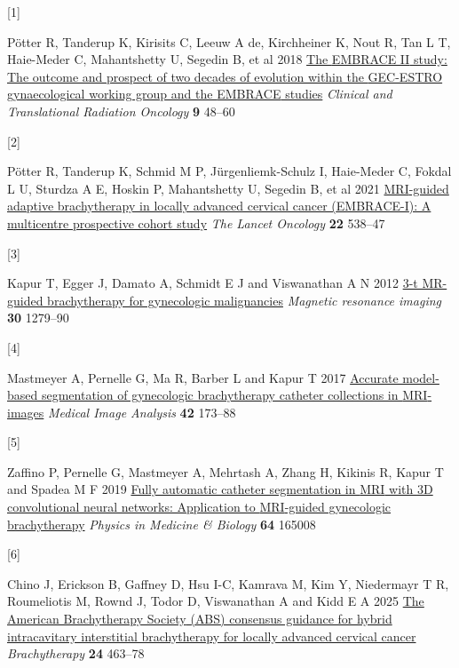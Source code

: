 \documentclass[
  11pt,
]{article}
\newlength{\cslhangindent}
\newlength{\csllabelwidth}
\newenvironment{CSLReferences}[2] %
 {\begin{list}{}{%
  \setlength{\itemindent}{0pt}
  \setlength{\leftmargin}{0pt}
  \setlength{\parsep}{0pt}
  \ifodd #1
   \setlength{\leftmargin}{\cslhangindent}
   \setlength{\itemindent}{-1\cslhangindent}
  \fi
  \setlength{\itemsep}{#2\baselineskip}}}
 {\end{list}}
\newcommand{\CSLLeftMargin}[1]{\parbox[t]{\csllabelwidth}{\strut#1\strut}}
\newcommand{\CSLRightInline}[1]{\parbox[t]{\linewidth - \csllabelwidth}{\strut#1\strut}}
\begin{document}
\label{refs}
\begin{CSLReferences}{0}{1}
\CSLLeftMargin{{[}1{]} }%
\CSLRightInline{Pötter R, Tanderup K, Kirisits C, Leeuw A de,
Kirchheiner K, Nout R, Tan L T, Haie-Meder C, Mahantshetty U, Segedin B,
et al 2018 \href{https://doi.org/10.1016/j.ctro.2018.01.001}{The
{EMBRACE II} study: The outcome and prospect of two decades of evolution
within the {GEC-ESTRO} gynaecological working group and the {EMBRACE}
studies} \emph{Clinical and Translational Radiation Oncology} \textbf{9}
48--60}

\CSLLeftMargin{{[}2{]} }%
\CSLRightInline{Pötter R, Tanderup K, Schmid M P, Jürgenliemk-Schulz I,
Haie-Meder C, Fokdal L U, Sturdza A E, Hoskin P, Mahantshetty U, Segedin
B, et al 2021
\href{https://doi.org/10.1016/S1470-2045(20)30753-1}{{MRI}-guided
adaptive brachytherapy in locally advanced cervical cancer
({EMBRACE-I}): A multicentre prospective cohort study} \emph{The Lancet
Oncology} \textbf{22} 538--47}

\CSLLeftMargin{{[}3{]} }%
\CSLRightInline{Kapur T, Egger J, Damato A, Schmidt E J and Viswanathan
A N 2012 \href{https://doi.org/10.1016/j.mri.2012.06.003}{3-t MR-guided
brachytherapy for gynecologic malignancies} \emph{Magnetic resonance
imaging} \textbf{30} 1279--90}

\CSLLeftMargin{{[}4{]} }%
\CSLRightInline{Mastmeyer A, Pernelle G, Ma R, Barber L and Kapur T 2017
\href{https://doi.org/10.1016/j.media.2017.06.011}{Accurate model-based
segmentation of gynecologic brachytherapy catheter collections in
{MRI}-images} \emph{Medical Image Analysis} \textbf{42} 173--88}

\CSLLeftMargin{{[}5{]} }%
\CSLRightInline{Zaffino P, Pernelle G, Mastmeyer A, Mehrtash A, Zhang H,
Kikinis R, Kapur T and Spadea M F 2019
\href{https://doi.org/10.1088/1361-6560/ab2f47}{Fully automatic catheter
segmentation in {MRI} with {3D} convolutional neural networks:
Application to {MRI}-guided gynecologic brachytherapy} \emph{Physics in
Medicine \& Biology} \textbf{64} 165008}

\CSLLeftMargin{{[}6{]} }%
\CSLRightInline{Chino J, Erickson B, Gaffney D, Hsu I-C, Kamrava M, Kim
Y, Niedermayr T R, Roumeliotis M, Rownd J, Todor D, Viswanathan A and
Kidd E A 2025 \href{https://doi.org/10.1016/j.brachy.2025.05.001}{The
{American Brachytherapy Society} ({ABS}) consensus guidance for hybrid
intracavitary interstitial brachytherapy for locally advanced cervical
cancer} \emph{Brachytherapy} \textbf{24} 463--78}


\end{CSLReferences}
\end{document}

